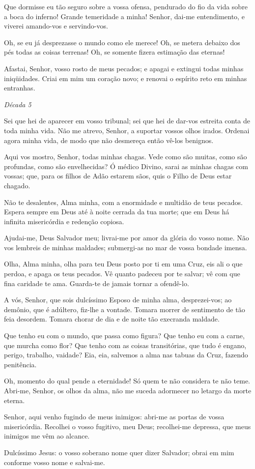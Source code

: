 Que dormisse eu tão seguro sobre a vossa ofensa, pendurado do fio da vida sobre a boca do inferno! Grande temeridade a minha! Senhor, dai-me entendimento, e viverei amando-vos e servindo-vos.

Oh, se eu já desprezasse o mundo como ele merece! Oh, se metera debaixo dos pés todas as coisas terrenas! Oh, se somente fizera estimação das eternas!

Afastai, Senhor, vosso rosto de meus pecados; e apagai e extingui todas minhas iniqüidades. Criai em mim um coração novo; e renovai o espírito reto em minhas entranhas.

\begin{nscenter} \emph{Década 5} \end{nscenter}

Sei que hei de aparecer em vosso tribunal; sei que hei de dar-vos estreita conta de toda minha vida. Não me atrevo, Senhor, a suportar vossos olhos irados. Ordenai agora minha vida, de modo que não desmereça então vê-los benignos.

Aqui vos mostro, Senhor, todas minhas chagas. Vede como são muitas, como são profundas, como são envelhecidas? Ó médico Divino, sarai as minhas chagas com vossas; que, para os filhos de Adão estarem sãos, quis o Filho de Deus estar chagado.

Não te desalentes, Alma minha, com a enormidade e multidão de teus pecados. Espera sempre em Deus até à noite cerrada da tua morte; que em Deus há infinita misericórdia e redenção copiosa.

Ajudai-me, Deus Salvador meu; livrai-me por amor da glória do vosso nome. Não vos lembreis de minhas maldades; submergi-as no mar de vossa bondade imensa.

Olha, Alma minha, olha para teu Deus posto por ti em uma Cruz, eis ali o que perdoa, e apaga os teus pecados. Vê quanto padeceu por te salvar; vê com que fina caridade te ama. Guarda-te de jamais tornar a ofendê-lo.

A vós, Senhor, que sois dulcíssimo Esposo de minha alma, desprezei-vos; ao demônio, que é adúltero, fiz-lhe a vontade. Tomara morrer de sentimento de tão feia desordem. Tomara chorar de dia e de noite tão execranda maldade.

Que tenho eu com o mundo, que passa como figura? Que tenho eu com a carne, que murcha como flor? Que tenho com as coisas transitórias, que tudo é engano, perigo, trabalho, vaidade? Eia, eia, salvemos a alma nas tabuas da Cruz, fazendo penitência.

Oh, momento do qual pende a eternidade! Só quem te não considera te não teme. Abri-me, Senhor, os olhos da alma, não me suceda adormecer no letargo da morte eterna.

Senhor, aqui venho fugindo de meus inimigos: abri-me as portas de vossa misericórdia. Recolhei o vosso fugitivo, meu Deus; recolhei-me depressa, que meus inimigos me vêm ao alcance.

Dulcíssimo Jesus: o vosso soberano nome quer dizer Salvador; obrai em mim conforme vosso nome e salvai-me.
